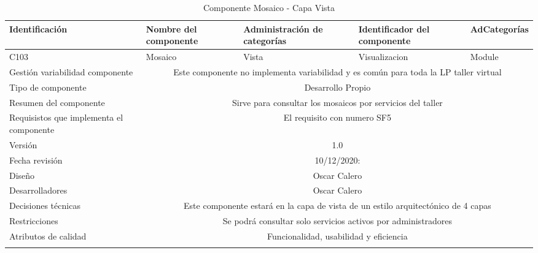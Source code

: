 \documentclass[10pt,a4paper,openany]{book}
\begin{document}
\begin{longtable}{|p{3cm}|p{3cm}|p{3cm}|p{3cm}|p{3cm}|} \hline
Identificación & Nombre del componente & Administración de categorías & Identificador del componente & AdCategorías \\[0.5ex] \hline
C103& Mosaico& Vista& Visualizacion& Module\\[0.5ex] \hline
Gestión variabilidad componente & \multicolumn{4}{|c|}{Este componente no implementa variabilidad y es común para toda la LP taller virtual} \\ \hline
Tipo de componente & \multicolumn{4}{|c|}{Desarrollo Propio} \\ \hline
Resumen del componente & \multicolumn{4}{|c|}{Sirve para consultar los mosaicos por servicios del taller} \\ \hline
Requisistos que implementa el componente & \multicolumn{4}{|c|}{El requisito con numero SF5 } \\ \hline
Versión & \multicolumn{4}{|c|}{1.0 } \\ \hline
Fecha revisión & \multicolumn{4}{|c|}{ 10/12/2020:} \\ \hline
Diseño & \multicolumn{4}{|c|}{Oscar Calero} \\ \hline
Desarrolladores & \multicolumn{4}{|c|}{Oscar Calero} \\ \hline
Decisiones técnicas & \multicolumn{4}{|c|}{Este componente estará en la capa de vista de un estilo arquitectónico de 4 capas  } \\ \hline
Restricciones & \multicolumn{4}{|c|}{Se podrá consultar solo servicios activos por administradores} \\ \hline
Atributos de calidad & \multicolumn{4}{|c|}{Funcionalidad, usabilidad y eficiencia} \\ \hline
\caption{Componente Mosaico - Capa Vista}
\label{table:t6}
\end{longtable}
\end{document}
